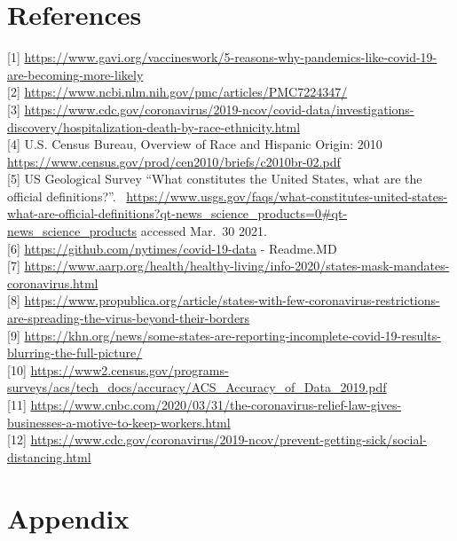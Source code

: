 \documentclass[
]{article}
\begin{document}
\hypertarget{references}{%
\section{References}\label{references}}

{[}1{]}
\url{https://www.gavi.org/vaccineswork/5-reasons-why-pandemics-like-covid-19-are-becoming-more-likely}\\
{[}2{]} \url{https://www.ncbi.nlm.nih.gov/pmc/articles/PMC7224347/}\\
{[}3{]}
\url{https://www.cdc.gov/coronavirus/2019-ncov/covid-data/investigations-discovery/hospitalization-death-by-race-ethnicity.html}\\
{[}4{]} U.S. Census Bureau, Overview of Race and Hispanic Origin: 2010
\url{https://www.census.gov/prod/cen2010/briefs/c2010br-02.pdf}\\
{[}5{]} US Geological Survey ``What constitutes the United States, what
are the official definitions?''.
~\url{https://www.usgs.gov/faqs/what-constitutes-united-states-what-are-official-definitions?qt-news_science_products=0\#qt-news_science_products}
accessed Mar.~30 2021.\\
{[}6{]} \url{https://github.com/nytimes/covid-19-data} - Readme.MD\\
{[}7{]}
\url{https://www.aarp.org/health/healthy-living/info-2020/states-mask-mandates-coronavirus.html}\\
{[}8{]}
\url{https://www.propublica.org/article/states-with-few-coronavirus-restrictions-are-spreading-the-virus-beyond-their-borders}\\
{[}9{]}
\url{https://khn.org/news/some-states-are-reporting-incomplete-covid-19-results-blurring-the-full-picture/}\\
{[}10{]}
\url{https://www2.census.gov/programs-surveys/acs/tech_docs/accuracy/ACS_Accuracy_of_Data_2019.pdf}\\
{[}11{]}
\url{https://www.cnbc.com/2020/03/31/the-coronavirus-relief-law-gives-businesses-a-motive-to-keep-workers.html}\\
{[}12{]}
\url{https://www.cdc.gov/coronavirus/2019-ncov/prevent-getting-sick/social-distancing.html}\\

\newpage

\hypertarget{appendix}{%
\section{Appendix}\label{appendix}}
\end{document}
